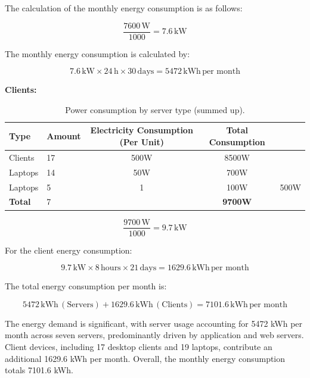 The calculation of the monthly energy consumption is as follows:

\begin{equation}
\frac{7600 \, \text{W}}{1000} = 7.6 \, \text{kW}
\end{equation}

The monthly energy consumption is calculated by:

\begin{equation}
7.6 \, \text{kW} \times 24 \, \text{h} \times 30 \, \text{days} = 5472 \, \text{kWh} \, \text{per month}
\end{equation}


\textbf{Clients:}
\begin{table}[h!]
\centering
\begin{tabular}{llccc}
\toprule
\textbf{Type} & \textbf{Amount} & \textbf{Electricity Consumption (Per Unit)} & \textbf{Total Consumption} \\
\midrule
Clients & 17 & 500W & 8500W \\
Laptops & 14 & 50W & 700W \\
Laptops & 5 & 1 & 100W & 500W \\
\midrule
\textbf{Total}     & 7 &        & \textbf{9700W} \\
\bottomrule
\end{tabular}
\caption{Power consumption by server type (summed up).}
\label{tab:Power_client}
\end{table}

\begin{equation}
\frac{9700 \, \text{W}}{1000} = 9.7 \, \text{kW}
\end{equation}

For the client energy consumption:

\begin{equation}
9.7 \, \text{kW} \times 8 \, \text{hours} \times 21 \, \text{days} = 1629.6 \, \text{kWh} \, \text{per month}
\end{equation}

The total energy consumption per month is:

\begin{equation}
5472 \, \text{kWh} \, (\text{Servers}) + 1629.6 \, \text{kWh} \, (\text{Clients}) = 7101.6 \, \text{kWh} \, \text{per month}
\end{equation}

The energy demand is significant, with server usage accounting for 5472 kWh per month across seven servers, predominantly driven by application and web servers. Client devices, including 17 desktop clients and 19 laptops, contribute an additional 1629.6 kWh per month. Overall, the monthly energy consumption totals 7101.6 kWh.

